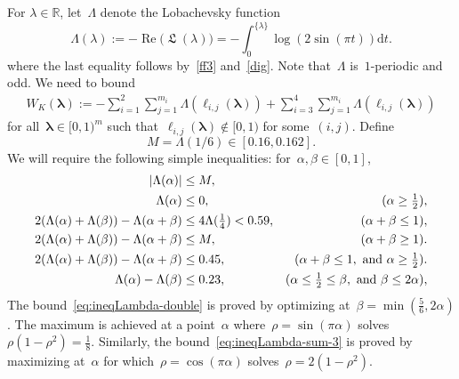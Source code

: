 \documentclass[11pt]{amsart}
\newcommand{\R}{\mathbb{R}}
\newcommand{\lambdab}{{\boldsymbol \lambda}}
\theoremstyle{definition}
\newcommand{\df}{\mathrm{d}}
\DeclareMathOperator{\Lie}{{\mathfrak L}}
\newcommand{\bs}{\boldsymbol }
\renewcommand\Re{\operatorname{Re}}
\newcommand{\1}{{\mathbf 1}}
\newcommand{\abs}[1]{\left|#1\right|}
\let\originalleft\left
\let\originalright\right
\renewcommand{\left}{\mathopen{}\mathclose\bgroup\originalleft}
\renewcommand{\right}{\aftergroup\egroup\originalright}
\numberwithin{equation}{section}
\begin{document}
For $\lambda\in\R$, let~$\Lambda$ denote the Lobachevsky function
$$ \Lambda(\lambda):=-\Re\Big(\Lie(\lambda)\Big)=-\int_0^{\{\lambda\}} \log(2\sin (\pi t))\df t.$$
where the last equality follows by~\eqref{ff3} and~\eqref{dig}. Note that~$\Lambda$ is~$1$-periodic and odd.
We need to bound 
\begin{align*}
  W_K(\bs \lambda):= -\sum_{i=1}^2\sum_{j=1}^{m_i}\Lambda(\ell_{i,j}(\bs \lambda)) + \sum_{i=3}^4\sum_{j=1}^{m_i} \Lambda(\ell_{i,j}(\bs \lambda))
\end{align*}
for all~$\lambdab \in [0, 1)^m$ such that~$\ell_{i,j}(\lambdab) \not\in [0, 1)$ for some~$(i, j)$. Define
$$ M = \Lambda(1/6) \in[0.16, 0.162]. $$
We will require the following simple inequalities: for~$\alpha, \beta \in [0, 1]$,
\begin{align}
  \abs{\Lambda(\alpha)} \leq{}& M, \label{eq:ineqLambda-tot} \\
  \Lambda(\alpha) \leq {}& 0, & (\alpha \geq \tfrac12), \label{eq:ineqLambda-pos} \\
  2(\Lambda(\alpha) + \Lambda(\beta)) - \Lambda(\alpha + \beta) \leq {}& 4\Lambda(\tfrac14) < 0.59,  & (\alpha + \beta \leq 1), \label{eq:ineqLambda-sum-1} \\
  2(\Lambda(\alpha) + \Lambda(\beta)) - \Lambda(\alpha + \beta) \leq {}& M,  & (\alpha + \beta \geq 1). \label{eq:ineqLambda-sum-2} \\
  2(\Lambda(\alpha) + \Lambda(\beta)) - \Lambda(\alpha + \beta) \leq {}& 0.45,  & (\alpha + \beta \leq 1, \text{ and } \alpha \geq \tfrac12). \label{eq:ineqLambda-sum-3} \\
  \Lambda(\alpha) - \Lambda(\beta) \leq {}& 0.23, & (\alpha \leq \tfrac12\leq \beta, \text{ and } \beta \leq 2\alpha), \label{eq:ineqLambda-double}
\end{align}
The bound~\eqref{eq:ineqLambda-double} is proved by optimizing at~$\beta = \min(\frac56, 2\alpha)$. The maximum is achieved at a point~$\alpha$ where~$\rho = \sin(\pi \alpha)$ solves~$\rho(1-\rho^2) = \frac18$. Similarly, the bound~\eqref{eq:ineqLambda-sum-3} is proved by maximizing at~$\alpha$ for which~$\rho = \cos(\pi \alpha)$ solves~$\rho = 2(1-\rho^2)$.
\end{document}
